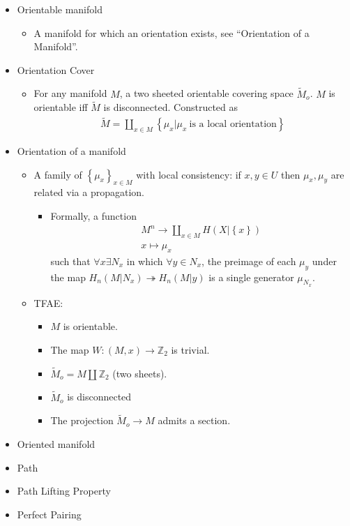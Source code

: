 \begin{itemize}
\item
  Orientable manifold

  \begin{itemize}
  \tightlist
  \item
    A manifold for which an orientation exists, see ``Orientation of a
    Manifold''.
  \end{itemize}
\item
  Orientation Cover

  \begin{itemize}
  \tightlist
  \item
    For any manifold \(M\), a two sheeted orientable covering space
    \(\tilde M_o\). \(M\) is orientable iff \(\tilde M\) is
    disconnected. Constructed as
    \begin{align*}\tilde M = \coprod_{x\in M}\left\{{\mu_x \mathrel{\Big|}\mu_x~ \text{is a local orientation}}\right\}\end{align*}
  \end{itemize}
\item
  Orientation of a manifold

  \begin{itemize}
  \tightlist
  \item
    A family of \(\left\{{\mu_x}\right\}_{x\in M}\) with local
    consistency: if \(x,y \in U\) then \(\mu_x, \mu_y\) are related via
    a propagation.

    \begin{itemize}
    \tightlist
    \item
      Formally, a function
      \begin{align*}M^n \to \coprod_{x\in M} H(X \mathrel{\Big|}\left\{{x}\right\})\\ x \mapsto \mu_x\end{align*}
      such that \(\forall x \exists N_x\) in which \(\forall y\in N_x\),
      the preimage of each \(\mu_y\) under the map
      \(H_n(M\mathrel{\Big|}N_x) \twoheadrightarrow H_n(M\mathrel{\Big|}y)\)
      is a single generator \(\mu_{N_x}\).
    \end{itemize}
  \item
    TFAE:

    \begin{itemize}
    \tightlist
    \item
      \(M\) is orientable.
    \item
      The map \(W: (M, x) \to {\mathbb{Z}}_2\) is trivial.
    \item
      \(\tilde M_o = M \coprod {\mathbb{Z}}_2\) (two sheets).
    \item
      \(\tilde M_o\) is disconnected
    \item
      The projection \(\tilde M_o \to M\) admits a section.
    \end{itemize}
  \end{itemize}
\item
  Oriented manifold
\item
  Path
\item
  Path Lifting Property
\item
  Perfect Pairing


\end{itemize}
